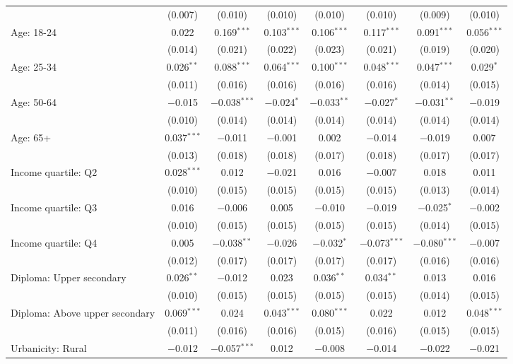 \begin{tabular}{@{\extracolsep{5pt}}lccccccc}
  & (0.007) & (0.010) & (0.010) & (0.010) & (0.010) & (0.009) & (0.010) \\ 
  Age: 18\mbox{-}24 & 0.022 & 0.169$^{***}$ & 0.103$^{***}$ & 0.106$^{***}$ & 0.117$^{***}$ & 0.091$^{***}$ & 0.056$^{***}$ \\ 
  & (0.014) & (0.021) & (0.022) & (0.023) & (0.021) & (0.019) & (0.020) \\ 
  Age: 25\mbox{-}34 & 0.026$^{**}$ & 0.088$^{***}$ & 0.064$^{***}$ & 0.100$^{***}$ & 0.048$^{***}$ & 0.047$^{***}$ & 0.029$^{*}$ \\ 
  & (0.011) & (0.016) & (0.016) & (0.016) & (0.016) & (0.014) & (0.015) \\ 
  Age: 50\mbox{-}64 & $-$0.015 & $-$0.038$^{***}$ & $-$0.024$^{*}$ & $-$0.033$^{**}$ & $-$0.027$^{*}$ & $-$0.031$^{**}$ & $-$0.019 \\ 
  & (0.010) & (0.014) & (0.014) & (0.014) & (0.014) & (0.014) & (0.014) \\ 
  Age: 65+ & 0.037$^{***}$ & $-$0.011 & $-$0.001 & 0.002 & $-$0.014 & $-$0.019 & 0.007 \\ 
  & (0.013) & (0.018) & (0.018) & (0.017) & (0.018) & (0.017) & (0.017) \\ 
  Income quartile: Q2 & 0.028$^{***}$ & 0.012 & $-$0.021 & 0.016 & $-$0.007 & 0.018 & 0.011 \\ 
  & (0.010) & (0.015) & (0.015) & (0.015) & (0.015) & (0.013) & (0.014) \\ 
  Income quartile: Q3 & 0.016 & $-$0.006 & 0.005 & $-$0.010 & $-$0.019 & $-$0.025$^{*}$ & $-$0.002 \\ 
  & (0.010) & (0.015) & (0.015) & (0.015) & (0.015) & (0.014) & (0.015) \\ 
  Income quartile: Q4 & 0.005 & $-$0.038$^{**}$ & $-$0.026 & $-$0.032$^{*}$ & $-$0.073$^{***}$ & $-$0.080$^{***}$ & $-$0.007 \\ 
  & (0.012) & (0.017) & (0.017) & (0.017) & (0.017) & (0.016) & (0.016) \\ 
  Diploma: Upper secondary & 0.026$^{**}$ & $-$0.012 & 0.023 & 0.036$^{**}$ & 0.034$^{**}$ & 0.013 & 0.016 \\ 
  & (0.010) & (0.015) & (0.015) & (0.015) & (0.015) & (0.014) & (0.015) \\ 
  Diploma: Above upper secondary & 0.069$^{***}$ & 0.024 & 0.043$^{***}$ & 0.080$^{***}$ & 0.022 & 0.012 & 0.048$^{***}$ \\ 
  & (0.011) & (0.016) & (0.016) & (0.015) & (0.016) & (0.015) & (0.015) \\ 
  Urbanicity: Rural & $-$0.012 & $-$0.057$^{***}$ & 0.012 & $-$0.008 & $-$0.014 & $-$0.022 & $-$0.021 \\ 

\end{tabular}
